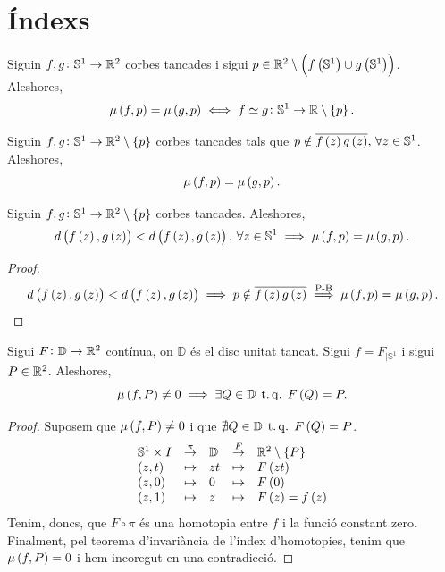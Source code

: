 \section{Índexs}
\begin{teo*}
    Siguin $f, g \colon \mathbb{S}^1 \to \mathbb{R} ^2$ corbes tancades i sigui $p\in \mathbb{R}^2 \setminus \left( f\left( \mathbb{S}^1\right) \cup g\left( \mathbb{S}^1\right)\right)$. Aleshores,
    \[
        \mu \left( f, p\right) = \mu\left( g, p \right) \iff f \simeq g  \colon \mathbb{S}^1 \to \mathbb{R} \setminus \left\{ p \right\}.
    \]
\end{teo*}

\begin{teo*}
    Siguin $f, g \colon \mathbb{S}^1 \to \mathbb{R} ^2 \setminus \left\{ p \right\}$ corbes tancades tals que $p \notin \overline{f\left( z \right) g \left( z \right)}, \, \forall z \in \mathbb{S}^1$. Aleshores,
    \[
        \mu \left( f, p\right) = \mu\left( g, p \right).
    \]
    
\end{teo*}

\begin{teo*}[Rouché]
    Siguin $f, g \colon \mathbb{S}^1 \to \mathbb{R} ^2 \setminus \left\{ p \right\}$ corbes tancades. Aleshores,
    \[
        d \left( f \left( z \right), g \left( z \right) \right) < d \left( f \left( z \right), g \left( z \right) \right), \, \forall z\in \mathbb{S}^1 \implies \mu \left( f, p\right) = \mu\left( g, p \right).
    \]
    
\end{teo*}
\begin{proof}
    \[
        d \left( f \left( z \right), g \left( z \right) \right) < d \left( f \left( z \right), g \left( z \right) \right) \implies p \notin \overline{f\left( z \right) g \left( z \right)} \stackrel{\text{P-B}}{\implies} \mu \left( f, p\right) = \mu\left( g, p \right).
    \]
\end{proof}
\begin{teo*}
    Sigui $F\colon \mathbb{D} \to \mathbb{R} ^2$ contínua, on $\mathbb{D}$ és el disc unitat tancat. Sigui $f=F_{|\mathbb{S}^1}$ i sigui $P \in \mathbb{R} ^2$. Aleshores,
    \[
        \mu\left( f, P \right) \neq 0 \implies \exists Q \in \mathbb{D} \operatorname{\;t.q.\;} F\left( Q \right) = P.
    \]
\end{teo*}

\begin{proof}
    Suposem que $\mu\left( f, P \right) \neq 0$ i que $\nexists Q \in \mathbb{D} \operatorname{\;t.q.\;} F\left( Q\right) = P$.
    \[
        \begin{array}{lclcl}
            \mathbb{S}^1 \times I & \stackrel{\pi}{\to} & \mathbb{D} & \stackrel{F}{\to} & \mathbb{R} ^2 \setminus \left\{ P \right\} \\
            \left( z, t \right) & \mapsto & zt & \mapsto & F\left( zt \right) \\
            \left( z, 0 \right) & \mapsto & 0 & \mapsto & F\left( 0 \right)\\
            \left( z, 1 \right) & \mapsto & z & \mapsto & F\left( z \right) = f\left( z \right)
        \end{array}
    \]
    Tenim, doncs, que $F \circ \pi$ és una homotopia entre $f$ i la funció constant zero. Finalment, pel teorema d'invariància de l'índex d'homotopies, tenim que $\mu \left( f, P \right) = 0$ i hem incoregut en una contradicció.
\end{proof}

